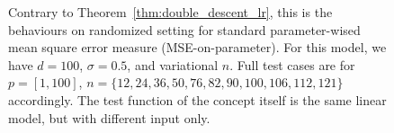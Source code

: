 \documentclass[twoside,10pt]{article}
\begin{document}
\begin{figure}[htb]
  \caption{Contrary to Theorem~\ref{thm:double_descent_lr}, this is the behaviours on randomized setting for standard parameter-wised mean square error measure (MSE-on-parameter). For this model, we have $d=100$, $\sigma = 0.5$, and variational $n$. Full test cases are for $p=[1,100]$, $n=\{12,24,36,50,76,82,90,100,106,112,121\}$ accordingly. The test function of the concept itself is the same linear model, but with different input only.}
  \label{fig:11grid2}
\end{figure}
\end{document}
